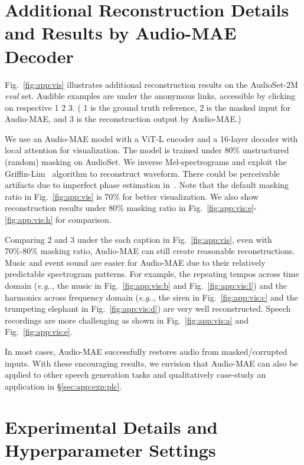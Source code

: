 \documentclass{article}
\makeatletter
\DeclareRobustCommand\onedot{\futurelet\@let@token\@onedot}
\def\@onedot{\ifx\@let@token.\else.\null\fi\xspace}
\def\eg{\emph{e.g}\onedot} \def\Eg{\emph{E.g}\onedot}
\makeatother
\begin{document}
\section{Additional Reconstruction Details and Results by Audio-MAE Decoder}
\label{sec:app:vis}

Fig.~\ref{fig:app:vis} illustrates additional reconstruction results on the AudioSet-2M \textit{eval} set.
Audible examples are under the anonymous links, accessible by clicking on respective {\color{hrefcolor} 1 2 3}. ({\color{hrefcolor} 1} is the ground truth reference, 
{\color{hrefcolor} 2} is the masked input for Audio-MAE, and {\color{hrefcolor} 3} is the reconstruction output by Audio-MAE.) 

We use an Audio-MAE model with a ViT-L encoder and a 16-layer decoder with local attention for visualization.
The model is trained under 80\%  unstructured (random) masking on AudioSet.
We inverse Mel-spectrograms and exploit the Griffin-Lim~\cite{griffin_lim} algorithm to reconstruct waveform.
There could be perceivable artifacts due to imperfect phase estimation in~\cite{griffin_lim}. 
Note that the default masking ratio in Fig.~\ref{fig:app:vis} is 70\% for better visualization.
We also show reconstruction results under 80\% masking ratio in Fig.~\ref{fig:app:vis:e}-\ref{fig:app:vis:h} for comparison.

Comparing {\color{hrefcolor} 2} and {\color{hrefcolor} 3} under the each caption in Fig.~\ref{fig:app:vis}, even with 70\%-80\% masking ratio, Audio-MAE can still create reasonable reconstructions. 
Music and event sound are easier for Audio-MAE due to their relatively predictable spectrogram patterns. 
For example, the repeating tempos across time domain (\eg, the music in Fig.~\ref{fig:app:vis:b} and Fig.~\ref{fig:app:vis:l}) 
and the harmonics across frequency domain (\eg, the siren in Fig.~\ref{fig:app:vis:c} and the trumpeting elephant in Fig.~\ref{fig:app:vis:d}) are very well reconstructed.
Speech recordings are more challenging as shown in Fig.~\ref{fig:app:vis:a} and Fig.~\ref{fig:app:vis:e}.

In most cases, Audio-MAE successfully restores audio from masked/corrupted inputs. With these encouraging results, we envision that Audio-MAE can also be applied to other speech generation tasks and qualitatively case-study an application in \S\ref{sec:app:exp:plc}.



\section{Experimental Details and Hyperparameter Settings}
\label{sec:app:hyper}
\end{document}
